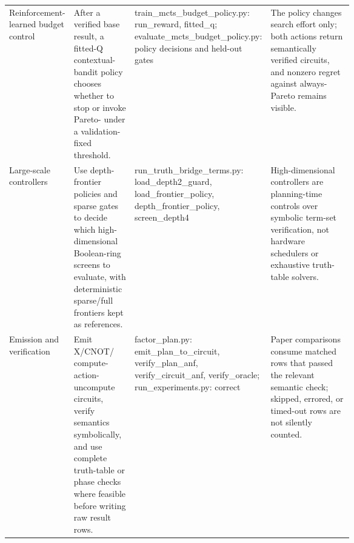 \begin{tabularx}{\linewidth}{>{\raggedright\arraybackslash}p{0.15\linewidth}>{\raggedright\arraybackslash}X>{\raggedright\arraybackslash}p{0.27\linewidth}>{\raggedright\arraybackslash}p{0.24\linewidth}}
Reinforcement-learned budget control & After a verified base \method{} result, a fitted-Q contextual-bandit policy chooses whether to stop or invoke Pareto-\method{} under a validation-fixed threshold. & train\_mcts\_budget\_policy.py: run\_reward, fitted\_q; evaluate\_mcts\_budget\_policy.py: policy decisions and held-out gates & The policy changes search effort only; both actions return semantically verified circuits, and nonzero regret against always-Pareto remains visible. \\
Large-scale controllers & Use depth-frontier policies and sparse gates to decide which high-dimensional Boolean-ring screens to evaluate, with deterministic sparse/full frontiers kept as references. & run\_truth\_bridge\_terms.py: load\_depth2\_guard, load\_frontier\_policy, depth\_frontier\_policy, screen\_depth4 & High-dimensional controllers are planning-time controls over symbolic term-set verification, not hardware schedulers or exhaustive truth-table solvers. \\
Emission and verification & Emit X/CNOT/\mct{} compute-action-uncompute circuits, verify \anf{} semantics symbolically, and use complete truth-table or phase checks where feasible before writing raw result rows. & factor\_plan.py: emit\_plan\_to\_circuit, verify\_plan\_anf, verify\_circuit\_anf, verify\_oracle; run\_experiments.py: correct & Paper comparisons consume matched rows that passed the relevant semantic check; skipped, errored, or timed-out rows are not silently counted. \\
\bottomrule
\end{tabularx}
